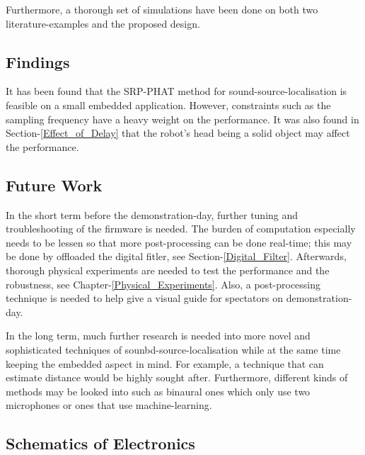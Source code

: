\documentclass[notitlepage]{report}
\begin{document}
Furthermore, a thorough set of simulations have been done on both two literature-examples and the proposed design.

\section{Findings}

It has been found that the SRP-PHAT method for sound-source-localisation is feasible on a small embedded application. However, constraints such as the sampling frequency have a heavy weight on the performance. It was also found in Section-\ref{Effect_of_Delay} that the robot's head being a solid object may affect the performance.

\section{Future Work}

In the short term before the demonstration-day, further tuning and troubleshooting of the firmware is needed. The burden of computation especially needs to be lessen so that more post-processing can be done real-time; this may be done by offloaded the digital fitler, see Section-\ref{Digital_Filter}. Afterwards, thorough physical experiments are needed to test the performance and the robustness, see Chapter-\ref{Physical_Experiments}. Also, a post-processing technique is needed to help give a visual guide for spectators on demonstration-day.

In the long term, much further research is needed into more novel and sophisticated techniques of sounbd-source-localisation while at the same time keeping the embedded aspect in mind. For example, a technique that can estimate distance would be highly sought after. Furthermore, different kinds of methods may be looked into such as binaural ones which only use two microphones or ones that use machine-learning.





\begin{appendices}
\chapter{Schematics of Electronics} \label{Schematics_of_Electronics}

\end{appendices}

%


%
%
%
\end{document}
